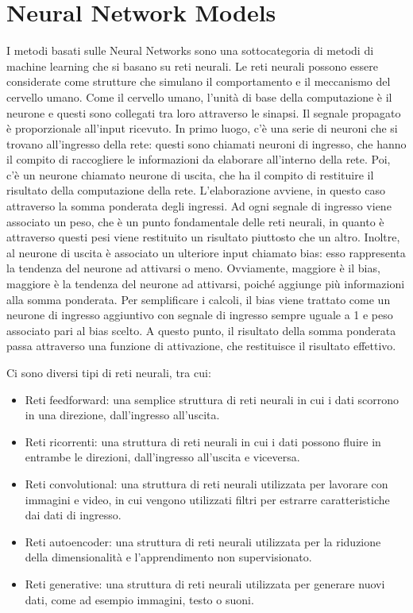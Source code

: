 \section{Neural Network Models}
I metodi basati sulle Neural Networks sono una sottocategoria di metodi di machine learning che si basano su reti neurali.
Le reti neurali possono essere considerate come strutture che simulano il comportamento e il meccanismo del cervello umano. Come il cervello umano, l'unità di base della computazione è il neurone e questi sono collegati tra loro attraverso le sinapsi.  Il segnale propagato è proporzionale all'input ricevuto.
In primo luogo, c'è una serie di neuroni che si trovano all'ingresso della rete: questi sono chiamati neuroni di ingresso, che hanno il compito di raccogliere le informazioni da elaborare all'interno della rete.
Poi, c'è un neurone chiamato neurone di uscita, che ha il compito di restituire il risultato della computazione della rete. L'elaborazione avviene, in questo caso attraverso la somma ponderata degli ingressi. 
Ad ogni segnale di ingresso viene associato un peso, che è un punto fondamentale delle reti neurali, in quanto è attraverso questi pesi viene restituito un risultato piuttosto che un altro. Inoltre, al neurone di uscita è associato un ulteriore input chiamato bias: esso rappresenta la tendenza del neurone ad attivarsi o meno. Ovviamente, maggiore è il bias, maggiore è la tendenza del neurone ad attivarsi, poiché aggiunge più informazioni alla somma ponderata. Per semplificare i calcoli, il bias viene trattato come un neurone di ingresso aggiuntivo con segnale di ingresso sempre uguale a 1 e peso associato pari al bias scelto. A questo punto, il risultato della somma ponderata passa attraverso una funzione di attivazione, che restituisce il risultato effettivo.

Ci sono diversi tipi di reti neurali, tra cui:
\begin{itemize}
\item Reti feedforward: una semplice struttura di reti neurali in cui i dati scorrono in una direzione, dall'ingresso all'uscita.
\item Reti ricorrenti: una struttura di reti neurali in cui i dati possono fluire in entrambe le direzioni, dall'ingresso all'uscita e viceversa.
\item  Reti convolutional: una struttura di reti neurali utilizzata per lavorare con immagini e video, in cui vengono utilizzati filtri per estrarre caratteristiche dai dati di ingresso.
\item Reti autoencoder: una struttura di reti neurali utilizzata per la riduzione della dimensionalità e l'apprendimento non supervisionato.
\item Reti generative: una struttura di reti neurali utilizzata per generare nuovi dati, come ad esempio immagini, testo o suoni.
\end{itemize}



